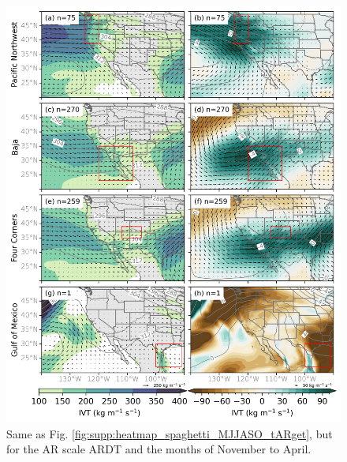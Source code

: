 \documentclass[draft,jgrga]{agutexSI2019}
\begin{document}
\begin{article}
\begin{figure}
\noindent\includegraphics[scale=0.8]{figS7.png}
\caption{Same as Fig. \ref{fig:supp:heatmap_spaghetti_MJJASO_tARget}, but for the AR scale ARDT and the months of November to April.}
\label{fig:supp:heatmap_spaghetti_NDJFMA_ARscale}
\end{figure}


\end{article}
\end{document}
